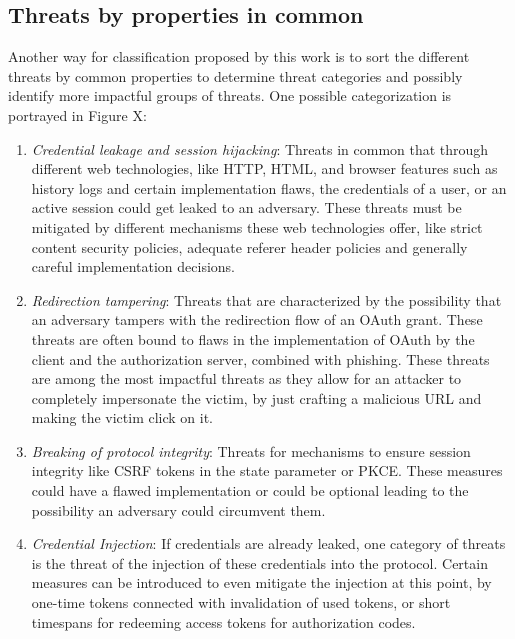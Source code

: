 \documentclass[
    fontsize=12pt,
    headings=small,
    parskip=half,           %
    bibliography=totoc,
    numbers=noenddot,       %
    open=any,               %
    ]{scrreprt}
\begin{document}
\subsection{Threats by properties in common}
Another way for classification proposed by this work is to sort the different threats by common properties to determine threat categories and possibly identify more impactful groups of threats. One possible categorization is portrayed in Figure X:
\begin{enumerate}
	\item \emph{Credential leakage and session hijacking}: Threats in common that through different web technologies, like HTTP, HTML, and browser features such as history logs and certain implementation flaws, the credentials of a user, or an active session could get leaked to an adversary. These threats must be mitigated by different mechanisms these web technologies offer, like strict content security policies, adequate referer header policies and generally careful implementation decisions. 
	\item \emph{Redirection tampering}: Threats that are characterized by the possibility that an adversary tampers with the redirection flow of an OAuth grant. These threats are often bound to flaws in the implementation of OAuth by the client and the authorization server, combined with phishing. These threats are among the most impactful threats as they allow for an attacker to completely impersonate the victim, by just crafting a malicious URL and making the victim click on it.
	\item \emph{Breaking of protocol integrity}: Threats for mechanisms to ensure session integrity like CSRF tokens in the state parameter or PKCE. These measures could have a flawed implementation or could be optional leading to the possibility an adversary could circumvent them.
	\item \emph{Credential Injection}: If credentials are already leaked, one category of threats is the threat of the injection of these credentials into the protocol. Certain measures can be introduced to even mitigate the injection at this point, by one-time tokens connected with invalidation of used tokens, or short timespans for redeeming access tokens for authorization codes.
\end{enumerate}
\end{document}
